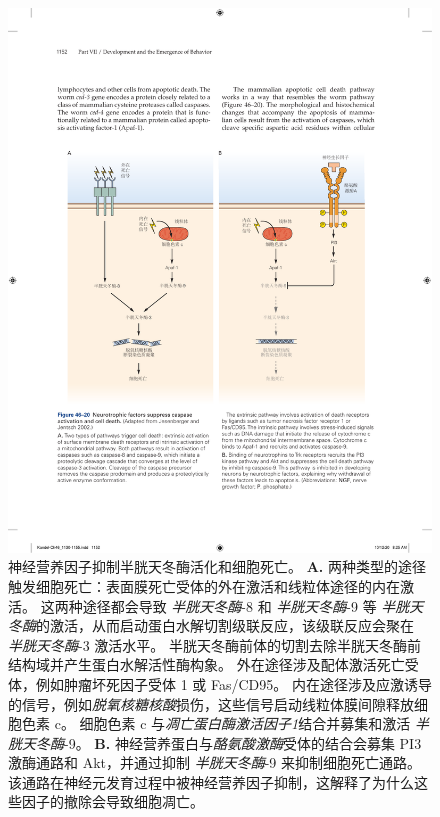 \begin{figure}[htbp]
	\centering
	\includegraphics[width=1.0\linewidth]{chap46/fig_46_20}
	\caption{神经营养因子抑制半胱天冬酶活化和细胞死亡\cite{jesenberger2002deadly}。
		\textbf{A.} 两种类型的途径触发细胞死亡：表面膜死亡受体的外在激活和线粒体途径的内在激活。
		这两种途径都会导致 \textit{半胱天冬酶}-8 和 \textit{半胱天冬酶}-9 等 \textit{半胱天冬酶}的激活，从而启动蛋白水解切割级联反应，该级联反应会聚在 \textit{半胱天冬酶}-3 激活水平。
		半胱天冬酶前体的切割去除半胱天冬酶前结构域并产生蛋白水解活性酶构象。
		外在途径涉及配体激活死亡受体，例如肿瘤坏死因子受体 1 或 Fas/CD95。
		内在途径涉及应激诱导的信号，例如\textit{脱氧核糖核酸}损伤，这些信号启动线粒体膜间隙释放细胞色素 c。
		细胞色素 c 与\textit{凋亡蛋白酶激活因子1}结合并募集和激活 \textit{半胱天冬酶}-9。
		\textbf{B.} 神经营养蛋白与\textit{酪氨酸激酶}受体的结合会募集 PI3 激酶通路和 Akt，并通过抑制 \textit{半胱天冬酶}-9 来抑制细胞死亡通路。
		该通路在神经元发育过程中被神经营养因子抑制，这解释了为什么这些因子的撤除会导致细胞凋亡。}
	\label{fig:46_20}
\end{figure}


